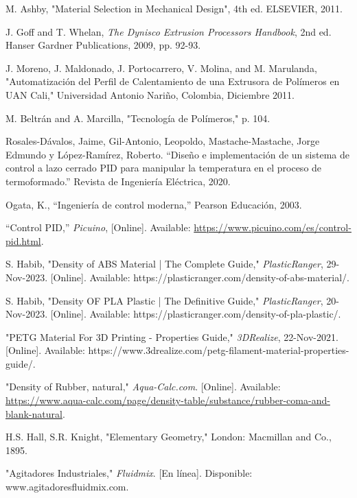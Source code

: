\documentclass[14pt,oneside]{extarticle} %
\begin{document}
\begin{thebibliography}{5}
    M. Ashby, "Material Selection in Mechanical Design", 4th ed. ELSEVIER, 2011.

    J. Goff and T. Whelan, \emph{The Dynisco Extrusion Processors Handbook}, 2nd ed. Hanser Gardner Publications, 2009, pp. 92-93.

    J. Moreno, J. Maldonado, J. Portocarrero, V. Molina, and M. Marulanda, "Automatización del Perfil de Calentamiento de una Extrusora de Polímeros en UAN Cali," Universidad Antonio Nariño, Colombia, Diciembre 2011.

    M. Beltrán and A. Marcilla, "Tecnología de Polímeros," p. 104.

    Rosales-Dávalos, Jaime, Gil-Antonio, Leopoldo, Mastache-Mastache, Jorge Edmundo y López-Ramírez, Roberto. ``Diseño e implementación de un sistema de control a lazo cerrado PID para manipular la temperatura en el proceso de termoformado.'' Revista de Ingeniería Eléctrica, 2020.

    Ogata, K., ``Ingeniería de control moderna,'' Pearson Educación, 2003.

     ``Control PID,'' \emph{Picuino}, [Online]. Available: \url{https://www.picuino.com/es/control-pid.html}.




    S. Habib, "Density of ABS Material | The Complete Guide," \textit{PlasticRanger}, 29-Nov-2023. [Online]. Available: https://plasticranger.com/density-of-abs-material/. 

    S. Habib, "Density OF PLA Plastic | The Definitive Guide," \textit{PlasticRanger}, 20-Nov-2023. [Online]. Available: https://plasticranger.com/density-of-pla-plastic/. 

    "PETG Material For 3D Printing - Properties Guide," \textit{3DRealize}, 22-Nov-2021. [Online]. Available: https://www.3drealize.com/petg-filament-material-properties-guide/. 

    "Density of Rubber, natural," \textit{Aqua-Calc.com}. [Online]. Available: \url{https://www.aqua-calc.com/page/density-table/substance/rubber-coma-and-blank-natural}. 

    H.S. Hall, S.R. Knight, "Elementary Geometry," London: Macmillan and Co., 1895.

    "Agitadores Industriales," \textit{Fluidmix}. [En línea]. Disponible: www.agitadoresfluidmix.com. 


\end{thebibliography}
\end{document}
